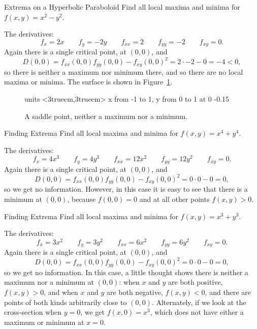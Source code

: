 \begin{example}{Extrema on a Hyperbolic Paraboloid}{}
Find all local maxima and minima for $f(x,y)=x^2-y^2$.
\end{example}
\begin{solution}
The derivatives:
$$f_x=2x \qquad f_y=-2y \qquad f_{xx}=2 \qquad f_{yy}=-2 \qquad
f_{xy}=0.$$
Again there is a single critical point, at $(0,0)$, and
$$D(0,0)=f_{xx}(0,0)f_{yy}(0,0)-f_{xy}(0,0)^2=
2\cdot-2-0=-4<0,$$
so there is neither a maximum nor minimum there, and so there are no
local maxima or minima. The surface is shown in
Figure~\ref{fig:saddle}. 
\end{solution}

\begin{figure}[H]
\centerline{
\vbox{\beginpicture
\normalgraphs
\setcoordinatesystem units <3truecm,3truecm>
\setplotarea x from -1 to 1, y from 0 to 1
 at 0 -0.15
\endpicture}}
\caption{A saddle point, neither a maximum nor a minimum.}
\label{fig:saddle}
\end{figure}

\begin{example}{Finding Extrema}{}
Find all local maxima and minima for $f(x,y)=x^4+y^4$.
\end{example}
\begin{solution}
The derivatives:
$$f_x=4x^3 \qquad f_y=4y^3 \qquad f_{xx}=12x^2 \qquad f_{yy}=12y^2 \qquad
f_{xy}=0.$$
Again there is a single critical point, at $(0,0)$, and
$$D(0,0)=f_{xx}(0,0)f_{yy}(0,0)-f_{xy}(0,0)^2=
0\cdot0-0=0,$$
so we get no information. However, in this case it is easy to see that
there is a minimum at $(0,0)$, because $f(0,0)=0$ and
at all other points $f(x,y)>0$.
\end{solution}

\begin{example}{Finding Extrema}{}
Find all local maxima and minima for $f(x,y)=x^3+y^3$.
\end{example}
\begin{solution}
The derivatives:
$$f_x=3x^2 \qquad f_y=3y^2 \qquad f_{xx}=6x^2 \qquad f_{yy}=6y^2 \qquad
f_{xy}=0.$$
Again there is a single critical point, at $(0,0)$, and
$$D(0,0)=f_{xx}(0,0)f_{yy}(0,0)-f_{xy}(0,0)^2=
0\cdot0-0=0,$$
so we get no information. In this case, a little thought shows there
is neither a maximum nor a minimum at $(0,0)$: when $x$ and $y$ are
both positive, $f(x,y)>0$, and when $x$ and $y$ are
both negative, $f(x,y)<0$, and there are points of both kinds
arbitrarily close to $(0,0)$. Alternately, if we look at the
cross-section when $y=0$, we get $f(x,0)=x^3$, which does not have
either a maximum or minimum at $x=0$.
\end{solution}


